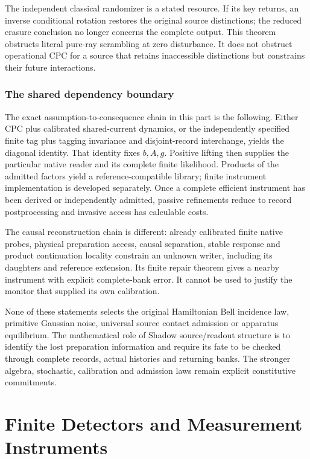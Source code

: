\documentclass[11pt,oneside,openany]{book}
\theoremstyle{definition}
\theoremstyle{remark}\newtheorem{remark}[theorem]{Remark}
\begin{document}
The independent classical randomizer is a stated resource. If its key returns, an inverse conditional rotation restores the original source distinctions; the reduced erasure conclusion no longer concerns the complete output. This theorem obstructs literal pure-ray scrambling at zero disturbance. It does not obstruct operational CPC for a source that retains inaccessible distinctions but constrains their future interactions.

\section{The shared dependency boundary}

The exact assumption-to-consequence chain in this part is the following. Either CPC plus calibrated shared-current dynamics, or the independently specified finite tag plus tagging invariance and disjoint-record interchange, yields the diagonal identity. That identity fixes $b,A,g$. Positive lifting then supplies the particular native reader and its complete finite likelihood. Products of the admitted factors yield a reference-compatible library; finite instrument implementation is developed separately. Once a complete efficient instrument has been derived or independently admitted, passive refinements reduce to record postprocessing and invasive access has calculable costs.

The causal reconstruction chain is different: already calibrated finite native probes, physical preparation access, causal separation, stable response and product continuation locality constrain an unknown writer, including its daughters and reference extension. Its finite repair theorem gives a nearby instrument with explicit complete-bank error. It cannot be used to justify the monitor that supplied its own calibration.

None of these statements selects the original Hamiltonian Bell incidence law, primitive Gaussian noise, universal source contact admission or apparatus equilibrium. The mathematical role of Shadow source/readout structure is to identify the lost preparation information and require its fate to be checked through complete records, actual histories and returning banks. The stronger algebra, stochastic, calibration and admission laws remain explicit constitutive commitments.


\part{Finite Detectors and Measurement Instruments}\label{part:detectors}
\end{document}
